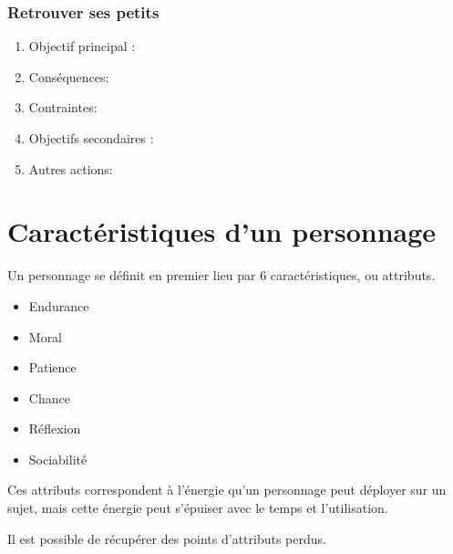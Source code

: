 \documentclass[twocolumn]{report}
\begin{document}
\subsubsection{Retrouver ses petits}
\begin{enumerate}
    \item Objectif principal :
    \item Conséquences:
    \item Contraintes:
    \item Objectifs secondaires :
    \item Autres actions:
\end{enumerate}
\section{Caractéristiques d'un personnage}
Un personnage se définit en premier lieu par 6 caractéristiques, ou attributs. 
\begin{itemize}
    \item Endurance
    \item Moral
    \item Patience
    \item Chance
    \item Réflexion
    \item Sociabilité
\end{itemize}
Ces attributs correspondent à l'énergie qu'un personnage peut déployer sur un sujet, mais cette énergie peut s'épuiser avec le temps et l'utilisation.

Il est possible de récupérer des points d'attributs perdus. %
\end{document}
